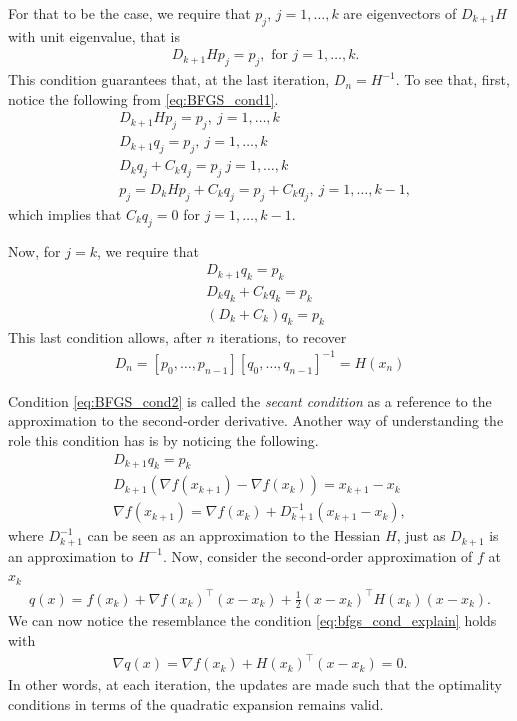 For that to be the case, we require that $p_j$, $j = 1, \dots, k$ are eigenvectors of $D_{k+1}H$ with unit eigenvalue, that is
%
\begin{align}
		& D_{k+1}Hp_j = p_j, \text{ for } j=1, \dots, k. \label{eq:BFGS_cond1}
\end{align}
%
This condition guarantees that, at the last iteration, $D_n = H^{-1}$. To see that, first, notice the following from \eqref{eq:BFGS_cond1}.
%
\begin{align*}
	& D_{k+1}Hp_j = p_j, \ j = 1,\dots,k \\
	& D_{k+1}q_j = p_j,\ j = 1,\dots,k \\
	& D_kq_j + C_kq_j = p_j \ j = 1,\dots,k \\
	& p_j = D_kHp_j + C_kq_j = p_j + C_kq_j,\ j = 1,\dots,k-1,
\end{align*}
%
which implies that $C_kq_j = 0$ for $j=1,\dots,k-1$. 

Now, for $j = k$, we require that 
%
\begin{align*}
	& D_{k+1} q_k  = p_k \\
	& D_k q_k + C_k q_k  = p_k \\
	& (D_k + C_k) q_k = p_k 
\end{align*}
%
This last condition allows, after $n$ iterations, to recover 
\begin{align}
	D_n = [p_0, \dots, p_{n-1}][q_0, \dots, q_{n-1}]^{-1} = H(x_n) 	\label{eq:BFGS_cond2}
\end{align}

Condition \eqref{eq:BFGS_cond2} is called the \emph{secant condition} as a reference to the approximation to the second-order derivative. Another way of understanding the role this condition has is by noticing the following.
\begin{align}
	D_{k+1} q_k  = p_k \nonumber \\
	D_{k+1}(\nabla f(x_{k+1}) - \nabla f(x_k)) = x_{k+1} - x_k \nonumber \\
	\nabla f(x_{k+1}) = \nabla f(x_k) + D_{k+1}^{-1}(x_{k+1} - x_k) \label{eq:bfgs_cond_explain}, 
\end{align}
%
where $D_{k+1}^{-1}$ can be seen as an approximation to the Hessian $H$, just as $D_{k+1}$ is an approximation to $H^{-1}$. Now, consider the second-order approximation of $f$ at $x_k$
\begin{align*}
	q(x) = f(x_k) + \nabla f(x_k)^\top(x -x_k) + \frac{1}{2}(x - x_k)^\top H(x_k)(x - x_k). 	
\end{align*}
We can now notice the resemblance the condition \eqref{eq:bfgs_cond_explain} holds with
%
\begin{align*}
	\nabla q(x) = \nabla f(x_k) + H(x_k)^\top(x - x_k) = 0.	
\end{align*}
% 
In other words, at each iteration, the updates are made such that the optimality conditions in terms of the quadratic expansion remains valid. 


